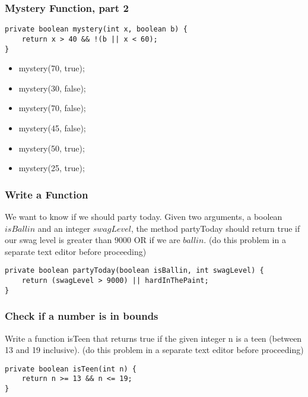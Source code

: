 \documentclass{beamer}
\begin{document}
\begin{frame}[fragile]
\frametitle{Mystery Function, part 2}
\begin{lstlisting}
private boolean mystery(int x, boolean b) {
    return x > 40 && !(b || x < 60);
}
\end{lstlisting}
\begin{itemize}
\item<2->mystery(70, true);
\item<3->mystery(30, false);
\item<4->mystery(70, false);
\item<5->mystery(45, false);
\item<6->mystery(50, true);
\item<7->mystery(25, true);
\end{itemize}
\end{frame}

\begin{frame}[fragile]
\frametitle{Write a Function}
We want to know if we should party today. Given two arguments, a boolean $isBallin$ and an integer $swagLevel$, the method partyToday should return true if our swag level is greater than $9000$ OR if we are $ballin$.
\pause
(do this problem in a separate text editor before proceeding)
\pause
\begin{lstlisting}
private boolean partyToday(boolean isBallin, int swagLevel) {
    return (swagLevel > 9000) || hardInThePaint;
}
\end{lstlisting}
\end{frame}

\begin{frame}[fragile]
\frametitle{Check if a number is in bounds}
Write a function isTeen that returns true if the given integer n is a teen (between 13 and 19 inclusive).
\pause
(do this problem in a separate text editor before proceeding)
\pause
\begin{lstlisting}
private boolean isTeen(int n) {
    return n >= 13 && n <= 19;
}
\end{lstlisting}
\end{frame}
\end{document}
